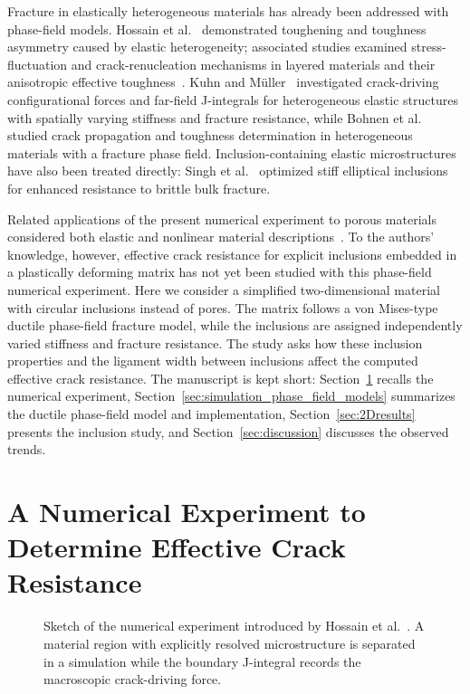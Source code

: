 \documentclass[pdflatex,sn-mathphys-num]{sn-jnl}
\begin{document}
Fracture in elastically heterogeneous materials has already been addressed with phase-field models. Hossain et al.~\cite{hossain_effective_2014} demonstrated toughening and toughness asymmetry caused by elastic heterogeneity; associated studies examined stress-fluctuation and crack-renucleation mechanisms in layered materials and their anisotropic effective toughness~\cite{hsueh_stress_2018,brach_anisotropy_2019}. Kuhn and M\"uller~\cite{kuhn_discussion_2016} investigated crack-driving configurational forces and far-field J-integrals for heterogeneous elastic structures with spatially varying stiffness and fracture resistance, while Bohnen et al.~\cite{bohnen_simulation_2024} studied crack propagation and toughness determination in heterogeneous materials with a fracture phase field. Inclusion-containing elastic microstructures have also been treated directly: Singh et al.~\cite{singh_optimization_2023} optimized stiff elliptical inclusions for enhanced resistance to brittle bulk fracture.

Related applications of the present numerical experiment to porous materials considered both elastic and nonlinear material descriptions~\cite{schluter_determination_2025,schluter_influence_2025}. To the authors' knowledge, however, effective crack resistance for explicit inclusions embedded in a plastically deforming matrix has not yet been studied with this phase-field numerical experiment. Here we consider a simplified two-dimensional material with circular inclusions instead of pores. The matrix follows a von Mises-type ductile phase-field fracture model, while the inclusions are assigned independently varied stiffness and fracture resistance. The study asks how these inclusion properties and the ligament width between inclusions affect the computed effective crack resistance. The manuscript is kept short: Section~\ref{sec:numericalExperiment} recalls the numerical experiment, Section~\ref{sec:simulation_phase_field_models} summarizes the ductile phase-field model and implementation, Section~\ref{sec:2Dresults} presents the inclusion study, and Section~\ref{sec:discussion} discusses the observed trends.

\section{A Numerical Experiment to Determine Effective Crack Resistance}\label{sec:numericalExperiment}

\begin{figure}[H]
    \centering
    \resizebox{0.6\textwidth}{!}{}
    \caption{Sketch of the numerical experiment introduced by Hossain et al.~\cite{hossain_effective_2014}. A material region with explicitly resolved microstructure is separated in a simulation while the boundary J-integral records the macroscopic crack-driving force.}
    \label{fig:numerical_experiment}
\end{figure}
\end{document}

